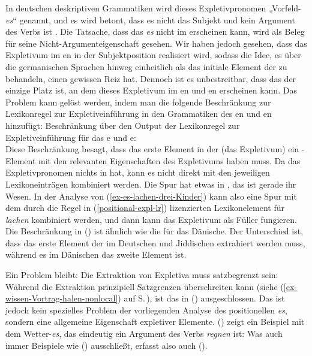 \eal
{}
\zl
In deutschen deskriptiven Grammatiken wird dieses Expletivpronomen „Vorfeld-\emph{es}“ genannt, und es wird betont, dass es
nicht das Subjekt und kein Argument des Verbs ist \parencites[, 177, 371]{Eisenberg2004a}[§1263]{Duden2005-Authors}. Die Tatsache, dass das \emph{es} nicht im
\mf erscheinen kann, wird als Beleg für seine Nicht-Argumenteigenschaft gesehen. Wir haben jedoch gesehen, dass das Expletivum
im en in der Subjektposition realisiert wird, sodass die Idee, es über die germanischen Sprachen hinweg
einheitlich als das initiale Element der \argstl zu behandeln, einen gewissen Reiz hat. Dennoch ist es
unbestreitbar, dass das \vf der einzige Platz ist, an dem dieses Expletivum im en und en erscheinen kann.
Das Problem kann gelöst werden, indem man die folgende Beschränkung zur Lexikonregel zur Expletiveinführung
in den Grammatiken des en und en hinzufügt:
\ea
Beschränkung über den Output der Lexikonregel zur Expletiveinführung für das e und e:\\
\z
Diese Beschränkung besagt, dass das erste Element in der \argstl (das Expletivum) ein \slasch-Element
mit den relevanten Eigenschaften des Expletivums haben muss. Da das Expletivpronomen nichts
in \slasch hat, kann es nicht direkt mit den jeweiligen Lexikoneinträgen kombiniert werden. Die Spur hat
etwas in \slasch, das ist gerade ihr Wesen. In der Analyse von (\ref{ex-es-lachen-drei-Kinder}) kann
also eine Spur mit dem durch die Regel in (\ref{positional-expl-lr}) lizenzierten
Lexikonelement für \emph{lachen} kombiniert werden, und dann kann das Expletivum als Füller fungieren. Die Beschränkung in 
() ist ähnlich wie die für das Dänische. Der Unterschied ist, dass das erste Element der \argstl
im Deutschen und Jiddischen extrahiert werden muss, während es im Dänischen das zweite Element ist.

Ein Problem bleibt: Die Extraktion von Expletiva muss satzbegrenzt sein:
\z
Während die Extraktion prinzipiell Satzgrenzen überschreiten kann (siehe
(\ref{ex-wissen-Vortrag-halen-nonlocal}) auf S.\,\pageref{ex-wissen-Vortrag-halen-nonlocal}), ist das in
() ausgeschlossen. Das ist jedoch kein spezielles Problem der vorliegenden Analyse des positionellen \emph{es},
sondern eine allgemeine Eigenschaft expletiver Elemente. () zeigt ein Beispiel mit dem Wetter-\emph{es},
das eindeutig ein Argument des Verbs \emph{regnen} ist:
\z
Was auch immer Beispiele wie () ausschließt, erfasst also auch ().

